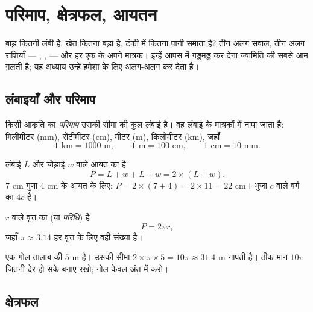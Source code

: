 \chapter{परिमाप, क्षेत्रफल, आयतन}\label{ch:g6:measure}

बाड़ कितनी लंबी है, खेत कितना बड़ा है, टंकी में कितना पानी समाता
है? तीन अलग सवाल, तीन अलग राशियाँ --- , ,  ---
और हर एक के अपने मात्रक। इन्हें आपस में गड्डमड्ड कर देना ज्यामिति
की सबसे आम ग़लती है; यह अध्याय उन्हें हमेशा के लिए अलग-अलग कर देता है।

\section{लंबाइयाँ और परिमाप}

\begin{definition}[परिमाप]\label{def:g6:measure:perimeter}
किसी आकृति का \emph{परिमाप} उसकी सीमा की कुल लंबाई
है। वह लंबाई के मात्रकों में नापा जाता है: मिलीमीटर (mm),
सेंटीमीटर (cm), मीटर (m), किलोमीटर (km), जहाँ
\[
1 \text{ km} = 1000 \text{ m}, \qquad
1 \text{ m} = 100 \text{ cm}, \qquad
1 \text{ cm} = 10 \text{ mm}.
\]
\end{definition}

\begin{example}\label{ex:g6:measure:perimeter}
लंबाई $L$ और चौड़ाई $w$ वाले आयत का  है
\[
P = L + w + L + w = 2 \times (L + w).
\]
$7$ cm गुणा $4$ cm के आयत के लिए: $P = 2 \times (7 + 4) = 2 \times 11 =
22$ cm। भुजा $c$ वाले वर्ग का  $4c$ है।
\end{example}

\begin{proposition}[वृत्त की परिधि]\label{prop:g6:measure:circle}
 $r$ वाले वृत्त का  (या \emph{परिधि}) है
\[
P = 2 \pi r ,
\]
जहाँ $\pi \approx 3.14$ हर वृत्त के लिए वही संख्या है।
\end{proposition}
\admitted

\begin{example}
एक गोल तालाब की  $5$ m है। उसकी सीमा
$2 \times \pi \times 5 = 10\pi \approx 31.4$ m नापती है। ठीक मान
$10\pi$ जितनी देर हो सके बनाए रखो; गोल केवल अंत में करो।
\end{example}

\section{क्षेत्रफल}

